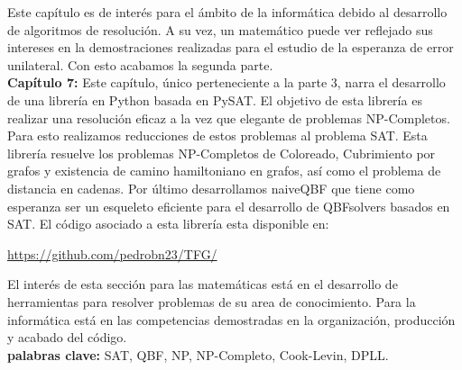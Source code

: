 Este capítulo es de interés para el ámbito de la informática debido al desarrollo de algoritmos de resolución. A su vez, un matemático puede ver reflejado sus intereses en la demostraciones realizadas para el estudio de la esperanza de error unilateral. Con esto acabamos la segunda parte.\\


\textbf{Capítulo 7:} Este capítulo, único perteneciente a la parte 3, narra el desarrollo de una librería en Python basada en PySAT. El objetivo de esta librería es realizar una resolución eficaz a la vez que elegante de problemas NP-Completos. Para esto realizamos reducciones de estos problemas al problema SAT. Esta librería resuelve los problemas NP-Completos de Coloreado, Cubrimiento por grafos y existencia de camino hamiltoniano en grafos, así como el problema de distancia en cadenas. Por último desarrollamos naiveQBF que tiene como esperanza ser un esqueleto eficiente para el desarrollo de QBFsolvers basados en SAT. El código asociado a esta librería esta disponible en:

\begin{center}
  \url{https://github.com/pedrobn23/TFG/}
\end{center}

El interés de esta sección para las matemáticas está en el desarrollo de herramientas para resolver problemas de su area de conocimiento. Para la informática está en las competencias demostradas en la organización, producción y acabado del código.\\

\textbf{palabras clave:} SAT, QBF, NP, NP-Completo, Cook-Levin, DPLL.





